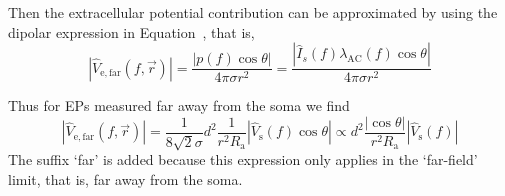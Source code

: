 Then the extracellular potential contribution can be approximated by using the 
dipolar expression in Equation~, that is,
\begin{equation}
  |\hat{V}_\mathrm{e,far}(f,\vec{r})| =  \frac{|p(f) \cos \theta|}{4 \pi \sigma r^2} 
                                            = \frac{| \hat{I}_{s}(f) \lambda_\mathrm{AC}(f) \cos \theta|}{4 \pi \sigma r^2}   
                                                                                        \label{Spikes:equation:Ve_far_1}
\end{equation}

%
Thus for EPs measured far away from the soma we find 
%  
\begin{equation}
  |\hat{V}_\mathrm{e,far}(f,\vec{r})|  = \frac{1}{8 \sqrt{2} \sigma} d^{2} \frac{1}{r^2  R_\mathrm{a}} 
      |\hat{V}_\mathrm{s}(f) \cos \theta | 
  \propto d^{2} \frac{|\cos \theta|}{r^2  R_\mathrm{a}} |\hat{V}_\mathrm{s}(f)| 
  \label{Spikes:equation:Ve_far_2}
\end{equation}
The suffix `far' is added because this expression only applies in the `far-field' limit, that is,
far away from the soma. 
%







